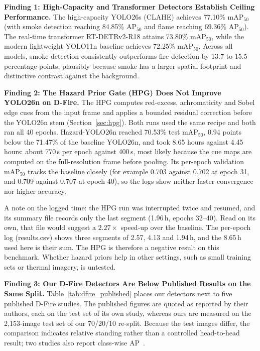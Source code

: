 \textbf{Finding 1: High-Capacity and Transformer Detectors Establish Ceiling Performance.}
The high-capacity YOLO26s (CLAHE) achieves 77.10\% mAP$_{50}$ (with smoke detection reaching 84.85\% AP$_{50}$ and flame reaching 69.36\% AP$_{50}$). The real-time transformer RT-DETRv2-R18 attains 73.80\% mAP$_{50}$, while the modern lightweight YOLO11n baseline achieves 72.25\% mAP$_{50}$. Across all models, smoke detection consistently outperforms fire detection by 13.7 to 15.5 percentage points, plausibly because smoke has a larger spatial footprint and distinctive contrast against the background.

\textbf{Finding 2: The Hazard Prior Gate (HPG) Does Not Improve YOLO26n on D-Fire.}
The HPG computes red-excess, achromaticity and Sobel edge cues from the input frame and applies a bounded residual correction before the YOLO26n stem (Section~\ref{sec:hpg}). Both runs used the same recipe and both ran all 40 epochs. Hazard-YOLO26n reached 70.53\% test mAP$_{50}$, 0.94 points below the 71.47\% of the baseline YOLO26n, and took 8.65 hours against 4.45 hours: about 770\,s per epoch against 400\,s, most likely because the cue maps are computed on the full-resolution frame before pooling. Its per-epoch validation mAP$_{50}$ tracks the baseline closely (for example 0.703 against 0.702 at epoch 31, and 0.709 against 0.707 at epoch 40), so the logs show neither faster convergence nor higher accuracy.

A note on the logged time: the HPG run was interrupted twice and resumed, and its summary file records only the last segment (1.96\,h, epochs 32--40). Read on its own, that file would suggest a $2.27\times$ speed-up over the baseline. The per-epoch log (results.csv) shows three segments of 2.57, 4.13 and 1.94\,h, and the 8.65\,h used here is their sum. The HPG is therefore a negative result on this benchmark. Whether hazard priors help in other settings, such as small training sets or thermal imagery, is untested.

\textbf{Finding 3: Our D-Fire Detectors Are Below Published Results on the Same Split.}
Table~\ref{tab:dfire_published} places our detectors next to five published D-Fire studies. The published figures are quoted as reported by their authors, each on the test set of its own study, whereas ours are measured on the 2{,}153-image test set of our 70/20/10 re-split. Because the test images differ, the comparison indicates relative standing rather than a controlled head-to-head result; two studies also report class-wise AP~\cite{venancio2023hybrid,goncalves2024yolo}.

